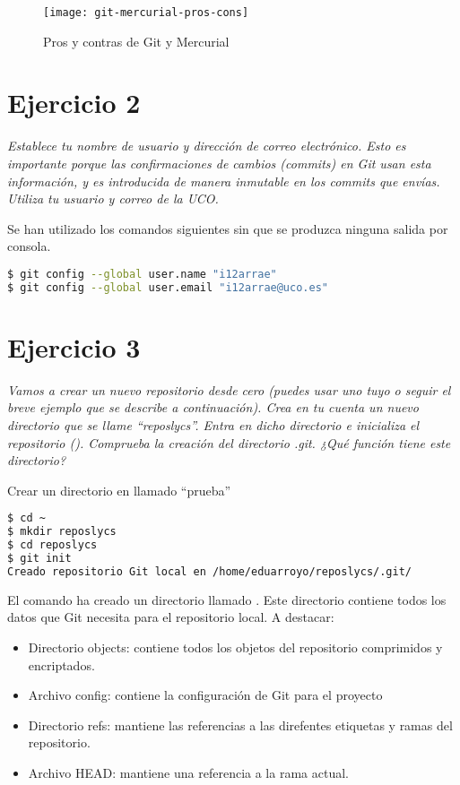 \begin{figure}[H]
    \centering
    \texttt{[image: git-mercurial-pros-cons]}
    \caption{Pros y contras de Git y Mercurial\cite{intland_2015:Pros_Cons_Mercurial_Git}}
    \label{fig:git-mercurial-pros-cons}
\end{figure}


\section{Ejercicio 2}
\begin{center}
    \parbox{12cm}{\justify\textit{
        Establece tu nombre de usuario y dirección de correo electrónico. Esto es importante porque las confirmaciones de cambios (commits) en Git usan esta información, y es introducida de manera inmutable en los commits que envías. Utiliza tu usuario y correo de la UCO.}}
    \end{center}

Se han utilizado los comandos siguientes sin que se produzca ninguna salida por consola.
\begin{lstlisting}[basicstyle=\small,xrightmargin=.10\textwidth,xleftmargin=.10\textwidth,language=bash]
$ git config --global user.name "i12arrae"
$ git config --global user.email "i12arrae@uco.es"
\end{lstlisting}


\section{Ejercicio 3}
\begin{center}
    \parbox{12cm}{\justify\textit{Vamos a crear un nuevo repositorio desde cero (puedes usar uno tuyo o seguir el breve ejemplo que se describe a continuación). Crea en tu cuenta un nuevo directorio que se llame “reposlycs”. Entra en dicho directorio e inicializa el repositorio (). Comprueba la creación del directorio .git. ¿Qué función tiene este directorio?
    }}
\end{center}
Crear un directorio en  llamado ``prueba''
\begin{lstlisting}[basicstyle=\small,xrightmargin=.10\textwidth,xleftmargin=.10\textwidth,language=bash]
$ cd ~
$ mkdir reposlycs
$ cd reposlycs
$ git init
Creado repositorio Git local en /home/eduarroyo/reposlycs/.git/
\end{lstlisting}

El comando ha creado un directorio llamado . Este directorio contiene todos los datos que Git necesita para el repositorio local. A destacar:
\begin{itemize}
    \item Directorio objects: contiene todos los objetos del repositorio comprimidos y encriptados.
    \item Archivo config: contiene la configuración de Git para el proyecto
    \item Directorio refs: mantiene las referencias a las direfentes etiquetas y ramas del repositorio.
    \item Archivo HEAD: mantiene una referencia a la rama actual.
\end{itemize}

